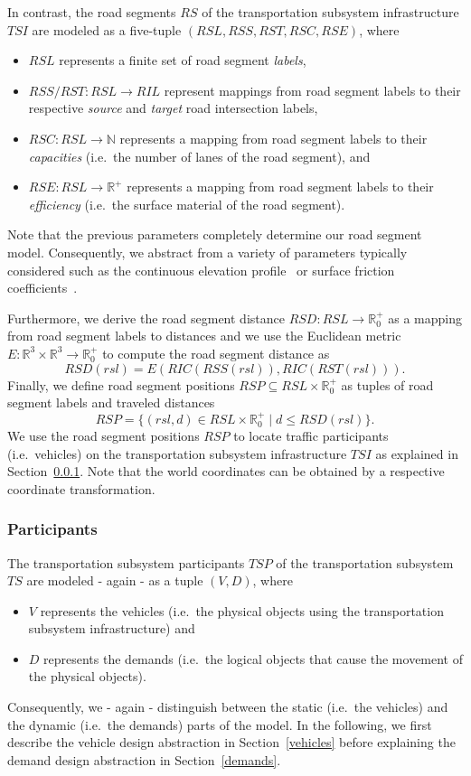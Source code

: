In contrast, the road segments $RS$ of the transportation subsystem infrastructure $TSI$ are modeled as a five-tuple $(RSL, RSS, RST, RSC, RSE)$, where
\begin{itemize}
	\item $RSL$ represents a finite set of road segment \textit{labels},
	\item $RSS/RST: RSL \rightarrow RIL$ represent mappings from road segment labels to their respective \textit{source} and \textit{target} road intersection labels,
	\item $RSC: RSL \rightarrow \mathbb{N}$ represents a mapping from road segment labels to their \textit{capacities} (i.e.\ the number of lanes of the road segment), and
	\item $RSE: RSL \rightarrow \mathbb{R}^+$ represents a mapping from road segment labels to their \textit{efficiency} (i.e.\ the surface material of the road segment).
\end{itemize}
Note that the previous parameters completely determine our road segment model. Consequently, we abstract from a variety of parameters typically considered such as the continuous elevation profile~\cite{?} or surface friction coefficients~\cite{?}.

Furthermore, we derive the road segment distance $RSD: RSL \rightarrow \mathbb{R}_0^+$ as a mapping from road segment labels to distances and we use the Euclidean metric $E: \mathbb{R}^3 \times \mathbb{R}^3 \rightarrow \mathbb{R}_0^+$ to compute the road segment distance as
\[
	RSD(rsl) = E(RIC(RSS(rsl)), RIC(RST(rsl))) \textrm{.}
\]
Finally, we define road segment positions $RSP \subseteq RSL \times \mathbb{R}_0^+$ as tuples of road segment labels and traveled distances
\[
	RSP = \{(rsl, d) \in RSL \times \mathbb{R}_0^+ \mid d \leq RSD(rsl)\} \textrm{.}
\]
We use the road segment positions $RSP$ to locate traffic participants (i.e.\ vehicles) on the transportation subsystem infrastructure $TSI$ as explained in Section~\ref{participants}. Note that the world coordinates can be obtained by a respective coordinate transformation.

\subsubsection{Participants}
\label{participants}

The transportation subsystem participants $TSP$ of the transportation subsystem $TS$ are modeled - again - as a tuple $(V, D)$, where
\begin{itemize}
	\item $V$ represents the vehicles (i.e.\ the physical objects using the transportation subsystem infrastructure) and
	\item $D$ represents the demands (i.e.\ the logical objects that cause the movement of the physical objects).
\end{itemize}
Consequently, we - again - distinguish between the static (i.e.\ the vehicles) and the dynamic (i.e.\ the demands) parts of the model. In the following, we first describe the vehicle design abstraction in Section~\ref{vehicles} before explaining the demand design abstraction in Section~\ref{demands}.

